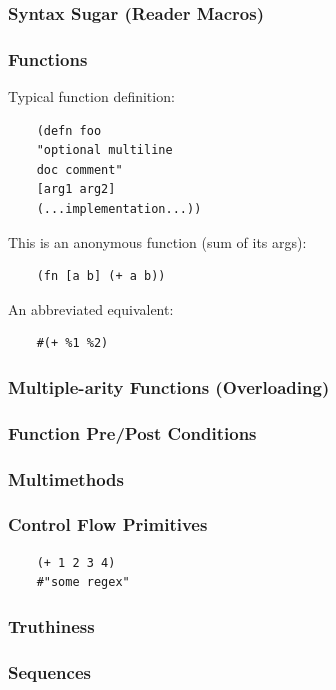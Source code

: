 \documentclass{beamer}
\begin{document}
\begin{frame}
  \frametitle{Syntax Sugar (Reader Macros)}
\end{frame}

\begin{frame}[fragile]
  \frametitle{Functions}
  Typical function definition:
  \begin{verbatim}
    (defn foo 
    "optional multiline 
    doc comment" 
    [arg1 arg2]
    (...implementation...))
  \end{verbatim}
  \vspace{1 cm}

  This is an anonymous function (sum of its args):
  \begin{verbatim}
    (fn [a b] (+ a b))   
  \end{verbatim}
  \vspace{1 cm}

  An abbreviated equivalent:
  \begin{verbatim}
    #(+ %1 %2)
  \end{verbatim}
\end{frame}

\begin{frame}
  \frametitle{Multiple-arity Functions (Overloading)}
\end{frame}

\begin{frame}
  \frametitle{Function Pre/Post Conditions}
\end{frame}

\begin{frame}
  \frametitle{Multimethods}
\end{frame}

\begin{frame}[fragile]
  \frametitle{Control Flow Primitives}
  \begin{verbatim}
    (+ 1 2 3 4)
    #"some regex"

  \end{verbatim}
\end{frame}

\begin{frame}
%
%
  \frametitle{Truthiness}
\end{frame}


\begin{frame}
  \frametitle{Sequences}
\end{frame}
\end{document}
